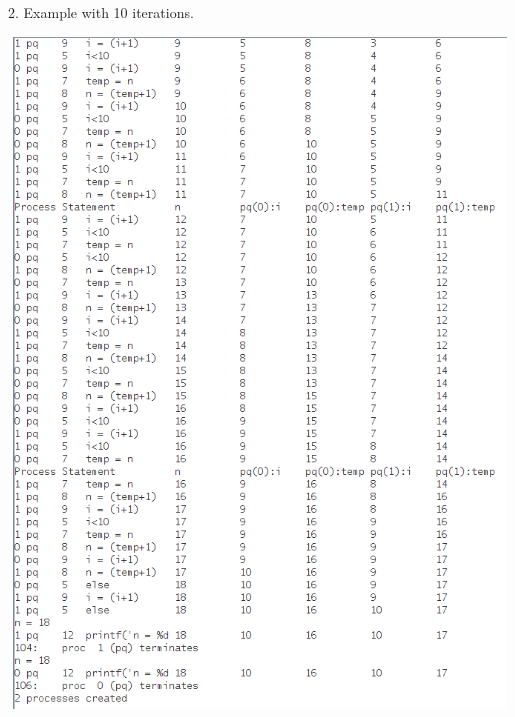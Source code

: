 \documentclass[14pt]{article}
\begin{document}
\newpage
\begin{center}
2. Example with 10 iterations.
\vspace{10mm}

\includegraphics[height=7in, width = 6in]{concurrent2.png}\\
\end{center}\\
\newpage
\end{document}
